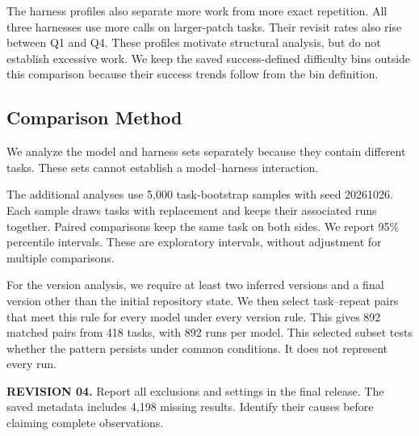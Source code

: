 \documentclass[10pt,a4paper,twocolumn]{article}
\newcommand{\rev}[2]{\par\smallskip\noindent\begin{minipage}{\linewidth}\color{revision}\footnotesize\textbf{REVISION #1.} #2\end{minipage}\par\smallskip}
\begin{document}
The harness profiles also separate more work from more exact repetition. All three harnesses use more calls on larger-patch tasks. Their revisit rates also rise between Q1 and Q4. These profiles motivate structural analysis, but do not establish excessive work. We keep the saved success-defined difficulty bins outside this comparison because their success trends follow from the bin definition.

\subsection{Comparison Method}\label{sec:comparison}
We analyze the model and harness sets separately because they contain different tasks. These sets cannot establish a model--harness interaction.

The additional analyses use 5,000 task-bootstrap samples with seed 20261026. Each sample draws tasks with replacement and keeps their associated runs together. Paired comparisons keep the same task on both sides. We report 95\% percentile intervals. These are exploratory intervals, without adjustment for multiple comparisons.

For the version analysis, we require at least two inferred versions and a final version other than the initial repository state. We then select task--repeat pairs that meet this rule for every model under every version rule. This gives 892 matched pairs from 418 tasks, with 892 runs per model. This selected subset tests whether the pattern persists under common conditions. It does not represent every run.
\rev{04}{Report all exclusions and settings in the final release. The saved metadata includes 4,198 missing results. Identify their causes before claiming complete observations.}
\end{document}
